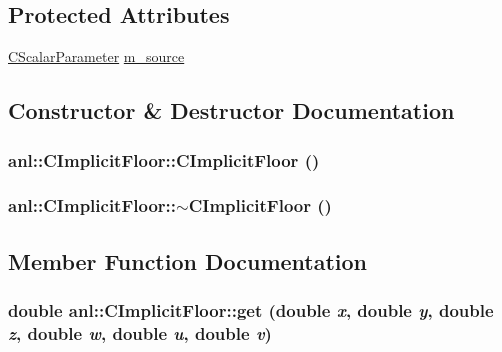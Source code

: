 \subsection*{Protected Attributes}
\begin{DoxyCompactItemize}
\item 
\hyperlink{classanl_1_1CScalarParameter}{CScalarParameter} \hyperlink{classanl_1_1CImplicitFloor_aaabb5e0d6aa551a02d73426148cdb66d}{m\_\-source}
\end{DoxyCompactItemize}


\subsection{Constructor \& Destructor Documentation}
\hypertarget{classanl_1_1CImplicitFloor_adeaeb85e37f0616366cea63e0d23c027}{
\subsubsection[{CImplicitFloor}]{\setlength{\rightskip}{0pt plus 5cm}anl::CImplicitFloor::CImplicitFloor ()}}
\label{classanl_1_1CImplicitFloor_adeaeb85e37f0616366cea63e0d23c027}
\hypertarget{classanl_1_1CImplicitFloor_a3e314e1ec4040391b32f809cf5776958}{
\subsubsection[{$\sim$CImplicitFloor}]{\setlength{\rightskip}{0pt plus 5cm}anl::CImplicitFloor::$\sim$CImplicitFloor ()}}
\label{classanl_1_1CImplicitFloor_a3e314e1ec4040391b32f809cf5776958}


\subsection{Member Function Documentation}
\hypertarget{classanl_1_1CImplicitFloor_af923d68186937208d6d877f69c1ab2dc}{
\subsubsection[{get}]{\setlength{\rightskip}{0pt plus 5cm}double anl::CImplicitFloor::get (double {\em x}, \/  double {\em y}, \/  double {\em z}, \/  double {\em w}, \/  double {\em u}, \/  double {\em v})}}
\label{classanl_1_1CImplicitFloor_af923d68186937208d6d877f69c1ab2dc}



